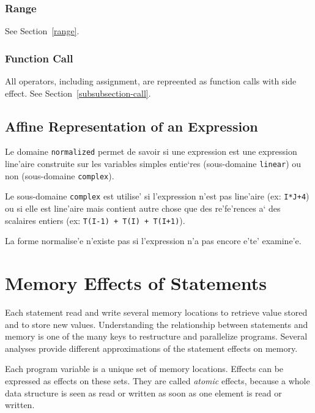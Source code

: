 \subsubsection{Range}

See Section~\ref{range}.

\subsubsection{Function Call}

All operators, including assignment, are repreented as function calls
with side effect. See Section~\ref{subsubsection-call}.

\subsection{Affine Representation of an Expression}
\label{subsection-normalized}

{ Le domaine {\tt normalized} permet de savoir si une expression est une
expression line'aire construite sur les variables simples entie`res
(sous-domaine {\tt linear}) ou non (sous-domaine {\tt complex}).

Le sous-domaine {\tt complex} est utilise' si l'expression n'est pas
line'aire (ex: {\tt I*J+4}) ou si elle est line'aire mais contient autre
chose que des re'fe'rences a` des scalaires entiers (ex: {\tt T(I-1) +
T(I) + T(I+1)}).

La forme normalise'e n'existe pas si l'expression n'a pas encore e'te'
examine'e. }

\section{Memory Effects of Statements}
\label{effects}

Each statement read and write several memory locations to retrieve value
stored and to store new values. Understanding the relationship between
statements and memory is one of the many keys to restructure and
parallelize programs. Several analyses provide different approximations
of the statement effects on memory.

Each program variable is a unique set of memory locations. Effects can
be expressed as effects on these sets. They are called {\em atomic}
effects, because a whole data structure is seen as read or written as
soon as one element is read or written.

